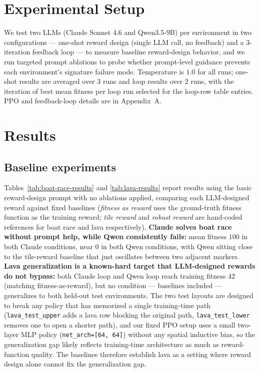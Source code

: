 \documentclass[11pt]{article}
\begin{document}
\section{Experimental Setup}
We test two LLMs (Claude Sonnet 4.6 and Qwen3.5-9B) per environment in two configurations --- one-shot reward design (single LLM call, no feedback) and a 3-iteration feedback loop --- to measure baseline reward-design behavior, and we run targeted prompt ablations to probe whether prompt-level guidance prevents each environment's signature failure mode. Temperature is $1.0$ for all runs; one-shot results are averaged over $3$ runs and loop results over $2$ runs, with the iteration of best mean fitness per loop run selected for the loop-row table entries. PPO and feedback-loop details are in Appendix~A.

\section{Results}

\subsection{Baseline experiments}
Tables~\ref{tab:boat-race-results} and \ref{tab:lava-results} report results using the basic reward-design prompt with no ablations applied, comparing each LLM-designed reward against fixed baselines (\textit{fitness as reward} uses the ground-truth fitness function as the training reward; \textit{tile reward} and \textit{robust reward} are hand-coded references for boat race and lava respectively). \textbf{Claude solves boat race without prompt help, while Qwen consistently fails:} mean fitness $100$ in both Claude conditions, near $0$ in both Qwen conditions, with Qwen sitting close to the tile-reward baseline that just oscillates between two adjacent markers. \textbf{Lava generalization is a known-hard target that LLM-designed rewards do not bypass:} both Claude loop and Qwen loop reach training fitness $42$ (matching fitness-as-reward), but no condition --- baselines included --- generalizes to both held-out test environments. The two test layouts are designed to break any policy that has memorized a single training-time path (\texttt{lava\_test\_upper} adds a lava row blocking the original path, \texttt{lava\_test\_lower} removes one to open a shorter path), and our fixed PPO setup uses a small two-layer MLP policy (\texttt{net\_arch=[64, 64]}) without any spatial inductive bias, so the generalization gap likely reflects training-time architecture as much as reward-function quality. The baselines therefore establish lava as a setting where reward design alone cannot fix the generalization gap.
\end{document}
